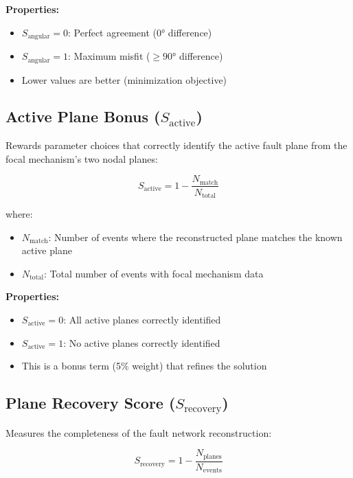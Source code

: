 \documentclass[11pt,a4paper]{article}
\begin{document}
\textbf{Properties:}
\begin{itemize}
    \item $S_{\text{angular}} = 0$: Perfect agreement (0° difference)
    \item $S_{\text{angular}} = 1$: Maximum misfit ($\geq 90°$ difference)
    \item Lower values are better (minimization objective)
\end{itemize}

\subsection{Active Plane Bonus ($S_{\text{active}}$)}

Rewards parameter choices that correctly identify the active fault plane from the focal mechanism's two nodal planes:

\begin{equation}
\label{eq:active_score}
S_{\text{active}} = 1 - \frac{N_{\text{match}}}{N_{\text{total}}}
\end{equation}

where:
\begin{itemize}
    \item $N_{\text{match}}$: Number of events where the reconstructed plane matches the known active plane
    \item $N_{\text{total}}$: Total number of events with focal mechanism data
\end{itemize}

\textbf{Properties:}
\begin{itemize}
    \item $S_{\text{active}} = 0$: All active planes correctly identified
    \item $S_{\text{active}} = 1$: No active planes correctly identified
    \item This is a bonus term (5\% weight) that refines the solution
\end{itemize}

\subsection{Plane Recovery Score ($S_{\text{recovery}}$)}

Measures the completeness of the fault network reconstruction:

\begin{equation}
\label{eq:recovery_score}
S_{\text{recovery}} = 1 - \frac{N_{\text{planes}}}{N_{\text{events}}}
\end{equation}
\end{document}
